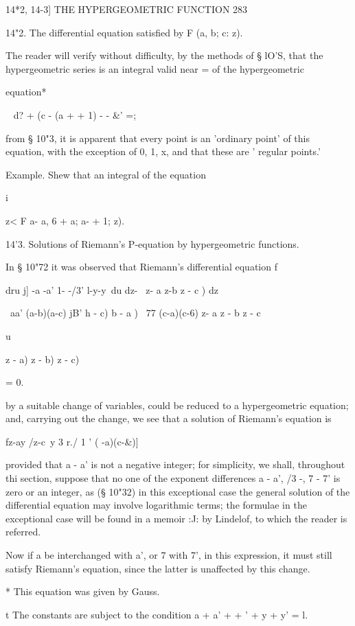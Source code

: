 14*2, 14-3] THE HYPERGEOMETRIC FUNCTION 283

14"2. The differential equation satisfied by F (a, b; c: z).

The reader will verify without difficulty, by the methods of § lO'S,
that the hypergeometric series is an integral valid near = of the
hypergeometric

equation*

   ~ d? + (c - (a + + 1) - - \&' =;

from § 10"3, it is apparent that every point is an 'ordinary point' of
this equation, with the exception of 0, 1, x, and that these are '
regular points.'

Example. Shew that an integral of the equation

i

z< F a- a, 6 + a; a- + 1; z).

14'3. Solutions of Riemann's P-equation by hypergeometric functions.

In § 10"72 it was observed that Riemann's differential equation f

dru j] -a -a' 1- -/3' l-y-y\ du dz- \ z- a z-b z - c ) dz

\ aa' (a-b)(a-c) jB' h - c) b - a ) \ 77 (c-a)(c-6) z- a z - b z - c

u

 z - a) z - b) z - c)

= 0.

by a suitable change of variables, could be reduced to a
hypergeometric equation; and, carrying out the change, we see that a
solution of Riemann's equation is

fz-ay /z-c\ y 3 r./ 1 ' ( -a)(c-\&)]

provided that a - a' is not a negative integer; for simplicity, we
shall, throughout thi section, suppose that no one of the exponent
differences a - a', /3 -, 7 - 7' is zero or an integer, as (§ 10"32)
in this exceptional case the general solution of the differential
equation may involve logarithmic terms; the formulae in the
exceptional case will be found in a memoir :J: by Lindelof, to which
the reader is referred.

Now if a be interchanged with a', or 7 with 7', in this expression, it
must still satisfy Riemann's equation, since the latter is unaffected
by this change.

* This equation was given by Gauss.

t The constants are subject to the condition a + a' + + ' + y + y' =
l.

